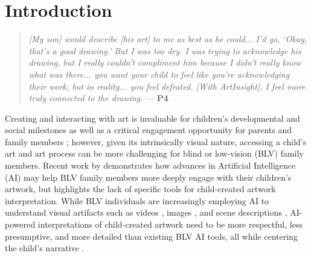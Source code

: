 \documentclass[sigconf]{acmart}
\begin{document}
\maketitle
\section{Introduction}

\begin{quote}
    \textit{[My son] would describe [his art] to me as best as he could... I'd go, `Okay, that's a good drawing.' But I was too dry. I was trying to acknowledge his drawing, but I really couldn't compliment him because I didn't really know what was there... you want your child to feel like you're acknowledging their work, but in reality... you feel defeated. [With ArtInsight], I feel more truly connected to the drawing.} --- \textbf{P4}
\end{quote}

Creating and interacting with art is invaluable for children’s developmental and social milestones \cite{importance_for_early_development_2024, Lynch_2012, Rymanowicz_2021} as well as a critical engagement opportunity for parents and family members \cite{how_parents_can_help_2024}; however, given its intrinsically visual nature, accessing a child's art and art process can be more challenging for blind or low-vision (BLV) family members. Recent work by \citet{chhedakothary2024} demonstrates how advances in Artificial Intelligence (AI) may help BLV family members more deeply engage with their children's artwork, but highlights the lack of specific tools for child-created artwork interpretation. While BLV individuals are increasingly employing AI to understand visual artifacts such as videos \cite{Bodi_Video, Yuksel_Video_HumanInTheLoop}, images \cite{Huh_GenAssist}, and scene descriptions \cite{gonzalez_CHI, be_my_ai_2024, seeing_ai}, AI-powered interpretations of child-created artwork need to be more respectful, less presumptive, and more detailed than existing BLV AI tools, all while centering the child's narrative \cite{chhedakothary2024}.
\end{document}
